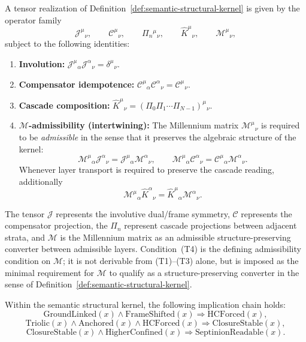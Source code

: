 \begin{definition}
\label{def:tensor-structural-kernel}
A tensor realization of Definition~\ref{def:semantic-structural-kernel}
is given by the operator family
\[
\mathcal J^\mu{}_{\nu},\qquad
\mathcal C^\mu{}_{\nu},\qquad
\Pi_n{}^\mu{}_{\nu},\qquad
\hat K^\mu{}_{\nu},\qquad
\mathcal M^\mu{}_{\nu},
\]
subject to the following identities:
\begin{enumerate}[label=(T\arabic*)]
  \item \textbf{Involution:}
    $\mathcal J^\mu{}_{\alpha}\mathcal J^\alpha{}_{\nu}=\delta^\mu{}_{\nu}$.
  \item \textbf{Compensator idempotence:}
    $\mathcal C^\mu{}_{\alpha}\mathcal C^\alpha{}_{\nu}=\mathcal C^\mu{}_{\nu}$.
  \item \textbf{Cascade composition:}
    $\hat K^\mu{}_{\nu}=(\Pi_0\Pi_1\cdots\Pi_{N-1})^\mu{}_{\nu}$.
  \item \textbf{$\mathcal M$-admissibility (intertwining):}
    The Millennium matrix $\mathcal M^\mu{}_{\nu}$ is required to be
    \emph{admissible} in the sense that it preserves the algebraic
    structure of the kernel:
    \[
      \mathcal M^\mu{}_{\alpha}\mathcal J^\alpha{}_{\nu}
      =\mathcal J^\mu{}_{\alpha}\mathcal M^\alpha{}_{\nu},
      \qquad
      \mathcal M^\mu{}_{\alpha}\mathcal C^\alpha{}_{\nu}
      =\mathcal C^\mu{}_{\alpha}\mathcal M^\alpha{}_{\nu}.
    \]
    Whenever layer transport is required to preserve the cascade reading,
    additionally
    \[
      \mathcal M^\mu{}_{\alpha}\hat K^\alpha{}_{\nu}
      =\hat K^\mu{}_{\alpha}\mathcal M^\alpha{}_{\nu}.
    \]
\end{enumerate}
The tensor $\mathcal J$ represents the involutive dual/frame symmetry,
$\mathcal C$ represents the compensator projection, the $\Pi_n$ represent
cascade projections between adjacent strata, and $\mathcal M$ is the
Millennium matrix as an admissible structure-preserving converter between
admissible layers. Condition~(T4) is the defining admissibility condition
on $\mathcal M$; it is not derivable from (T1)--(T3) alone, but is imposed
as the minimal requirement for $\mathcal M$ to qualify as a
structure-preserving converter in the sense of
Definition~\ref{def:semantic-structural-kernel}.
\end{definition}

\begin{proposition}
\label{prop:semantic-forcing-chain}
Within the semantic structural kernel, the following implication chain holds:
\[
\mathrm{GroundLinked}(x)\wedge \mathrm{FrameShifted}(x)
\Longrightarrow \mathrm{HCForced}(x),
\]
\[
\mathrm{Triolic}(x)\wedge \mathrm{Anchored}(x)\wedge \mathrm{HCForced}(x)
\Longrightarrow \mathrm{ClosureStable}(x),
\]
\[
\mathrm{ClosureStable}(x)\wedge \mathrm{HigherConfined}(x)
\Longrightarrow \mathrm{SeptinionReadable}(x).
\]
\end{proposition}

